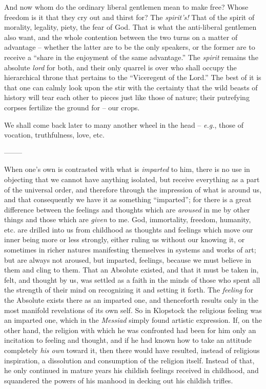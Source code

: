 \documentclass[12pt,a4paper]{book}
\begin{document}
And now whom do the ordinary liberal gentlemen mean to make free? Whose 
freedom is it that they cry out and thirst for? The \textit{spirit's!} That of 
the spirit of morality, legality, piety, the fear of God. That is what the 
anti-liberal gentlemen also want, and the whole contention between the two 
turns on a matter of advantage -- whether the latter are to be the only 
speakers, or the former are to receive a ``share in the enjoyment of the same 
advantage.'' The \textit{spirit} remains the absolute \textit{lord} for both, 
and their only quarrel is over who shall occupy the hierarchical throne that 
pertains to the ``Viceregent of the Lord.'' The best of it is that one can 
calmly look upon the stir with the certainty that the wild beasts of history 
will tear each other to pieces just like those of nature; their putrefying 
corpses fertilize the ground for -- our crops.

We shall come back later to many another wheel in the head -- \textit{e.g.}, 
those of vocation, truthfulness, love, etc.

\begin{center}
--------\end{center}


When one's own is contrasted with what is \textit{imparted} to him, there is 
no use in objecting that we cannot have anything isolated, but receive 
everything as a part of the universal order, and therefore through the 
impression of what is around us, and that consequently we have it as something 
``imparted''; for there is a great difference between the feelings and 
thoughts which are \textit{aroused} in me by other things and those which are 
\textit{given} to me. God, immortality, freedom, humanity, etc. are drilled 
into us from childhood as thoughts and feelings which move our inner being 
more or less strongly, either ruling us without our knowing it, or sometimes 
in richer natures manifesting themselves in systems and works of art; but are 
always not aroused, but imparted, feelings, because we must believe in them 
and cling to them. That an Absolute existed, and that it must be taken in, 
felt, and thought by us, was settled as a faith in the minds of those who 
spent all the strength of their mind on recognizing it and setting it forth. 
The \textit{feeling} for the Absolute exists there as an imparted one, and 
thenceforth results only in the most manifold revelations of its own self. So 
in Klopstock the religious feeling was an imparted one, which in the 
\textit{Messiad} simply found artistic expression. If, on the other hand, the 
religion with which he was confronted had been for him only an incitation to 
feeling and thought, and if he had known how to take an attitude completely 
\textit{his own} toward it, then there would have resulted, instead of 
religious inspiration, a dissolution and consumption of the religion itself. 
Instead of that, he only continued in mature years his childish feelings 
received in childhood, and squandered the powers of his manhood in decking out 
his childish trifles.
\end{document}
